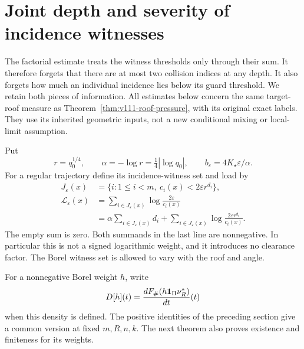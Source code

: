 \section{Joint depth and severity of incidence witnesses}
\label{sec:v112-load}
The factorial estimate treats the witness thresholds only through
 their sum. It therefore forgets that there are at most two collision
indices at any depth. It also forgets how much an individual incidence
lies below its guard threshold. We retain both pieces of information.
All estimates below concern the same target-roof measure as
Theorem~\ref{thm:v111-roof-pressure}, with its original exact labels.
They use its inherited geometric inputs, not a new conditional
mixing or local-limit assumption.

Put
\begin{equation}\label{eq:v112-depth-parameters}
 r=q_0^{1/4},\qquad \alpha=-\log r=\tfrac14|\log q_0|,
 \qquad b_\varepsilon=4K_\star\varepsilon/\alpha.
\end{equation}
For a regular trajectory define its incidence-witness set and load by
\begin{equation}\label{eq:v112-load}
 \begin{split}
 J_\varepsilon(x)&=\{i:1\le i<m,\ c_i(x)<2\varepsilon r^{d_i}\},\\
 \mathscr L_\varepsilon(x)
  &=\sum_{i\in J_\varepsilon(x)}\log\frac{2\varepsilon}{c_i(x)}\\
  &=\alpha\sum_{i\in J_\varepsilon(x)}d_i
       +\sum_{i\in J_\varepsilon(x)}
                       \log\frac{2\varepsilon r^{d_i}}{c_i(x)}.
 \end{split}
\end{equation}
The empty sum is zero. Both summands in the last line are
nonnegative. In particular this is not a signed logarithmic weight,
and it introduces no clearance factor. The Borel witness set is
allowed to vary with the roof and angle.

For a nonnegative Borel weight $h$, write
\[
 D[h](t)=\frac{dF_\#(h\mathbf1_\Pi\nu_R^*)}{dt}(t)
\]
when this density is defined. The positive identities of the
preceding section give a common version at fixed $m,R,n,k$.
The next theorem also proves existence and finiteness for its weights.

